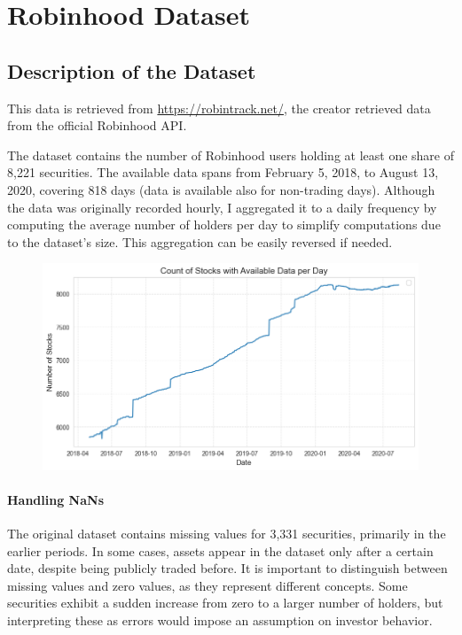 \section{Robinhood Dataset}
\subsection{Description of the Dataset}
This data is retrieved from \url{https://robintrack.net/}, the creator retrieved data from the official Robinhood API.

The dataset contains the number of Robinhood users holding at least one share of 8,221 securities. The available data spans from February 5, 2018, to August 13, 2020, covering 818 days (data is available also for non-trading days). Although the data was originally recorded hourly, I aggregated it to a daily frequency by computing the average number of holders per day to simplify computations due to the dataset's size. This aggregation can be easily reversed if needed. 


\begin{figure}[h!]
        \centering
        \includegraphics[width=0.8\linewidth]{Images/no_stocks_date.png}
        
\end{figure}


\paragraph{Handling NaNs}  
The original dataset contains missing values for 3,331 securities, primarily in the earlier periods. In some cases, assets appear in the dataset only after a certain date, despite being publicly traded before. It is important to distinguish between missing values and zero values, as they represent different concepts. Some securities exhibit a sudden increase from zero to a larger number of holders, but interpreting these as errors would impose an assumption on investor behavior.  

